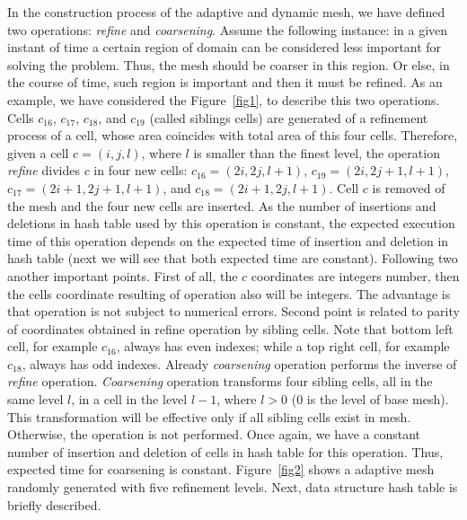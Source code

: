 \documentclass[review]{elsarticle}
\begin{document}
In the construction process of the adaptive and dynamic mesh, we have defined two operations: {\em refine} and {\em coarsening}. Assume the following instance: in a given instant of time a certain region of domain can be considered less important for solving the problem. Thus, the mesh should be coarser in this region. Or else, in the course of time, such region is important and then it must be refined. As an example, we have considered the Figure~\ref{fig1}, to describe this two operations. Cells $c_{16}$, $c_{17}$, $c_{18}$, and $c_{19}$ (called siblings cells) are generated of a refinement process of a cell, whose area coincides with total area of this four cells. Therefore, given a cell $c = (i, j, l)$, where $l$ is smaller than the finest level, the operation {\em refine} divides $c$ in four new cells: $c_{16}=(2i, 2j, l+1)$, $c_{19}=(2i, 2j + 1, l+1)$, $c_{17}=(2i+1, 2j+1, l+1)$, and $c_{18}=(2i+1, 2j, l+1)$. Cell $c$ is removed of the mesh and the four new cells are inserted. As the number of insertions and deletions in hash table used by this operation is constant, the expected execution time of this operation depends on the expected time of insertion and deletion in hash table (next we will see that both expected time are constant). Following two another important points. First of all, the $c$ coordinates are integers number, then the cells coordinate resulting of operation also will be integers. The advantage is that operation is not subject to numerical errors. Second point is related to parity of coordinates obtained in refine operation by sibling cells. Note that bottom left cell, for example $c_{16}$, always has even indexes; while a top right cell, for example $c_{18}$, always has odd indexes. Already {\em coarsening} operation performs the inverse of {\em refine} operation. {\em Coarsening} operation transforms four sibling cells, all in the same level $l$, in a cell in the level $l - 1$, where $l > 0$ ($0$ is the level of base mesh). This transformation will be effective only if all sibling cells exist in mesh. Otherwise, the operation is not performed. Once again, we have a constant number of insertion and deletion of cells in hash table for this operation. Thus, expected time for coarsening is constant. Figure~\ref{fig2} shows a adaptive mesh randomly generated with five refinement levels. Next, data structure hash table is briefly described.
\end{document}
